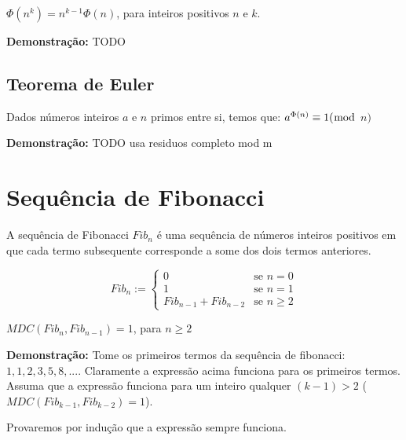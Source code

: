 \begin{corollary}\label{phi_potencia_nk}
$\Phi(n^k) = n^{k-1}\Phi(n)$, para inteiros positivos $n$ e $k$. 
\end{corollary}
\textbf{Demonstração:}
TODO


\subsection{Teorema de Euler}

\begin{theorem}\label{teorema_de_euler}
Dados números inteiros $a$ e $n$ primos entre si, temos que:
$a^{\Phi(n)} \equiv 1 (\bmod$ $n)$
\end{theorem}
\textbf{Demonstração:}
TODO usa residuos completo mod m




\section{Sequência de Fibonacci}

\begin{definition}
A sequência de Fibonacci $Fib_n$ é uma sequência de números inteiros positivos em que cada termo subsequente corresponde a some dos dois termos anteriores.

\[
 Fib_n :=
  \begin{cases}
   0 & \text{se } n = 0 \\
   1 & \text{se } n = 1 \\
   Fib_{n-1} + Fib_{n-2} & \text{se } n \geq 2
  \end{cases}
\]
\end{definition}


\begin{corollary}\label{gcd_consecutivo_fib}
$MDC(Fib_n, Fib_{n-1}) = 1$, para $n \geq 2$
\end{corollary}
\textbf{Demonstração:}
Tome os primeiros termos da sequência de fibonacci: $1, 1, 2, 3, 5, 8,...$.
Claramente a expressão acima funciona para os primeiros termos.
Assuma que a expressão funciona para um inteiro qualquer $(k-1) > 2$ ($MDC(Fib_{k-1}, Fib_{k-2}) = 1$).

Provaremos por indução que a expressão sempre funciona.

